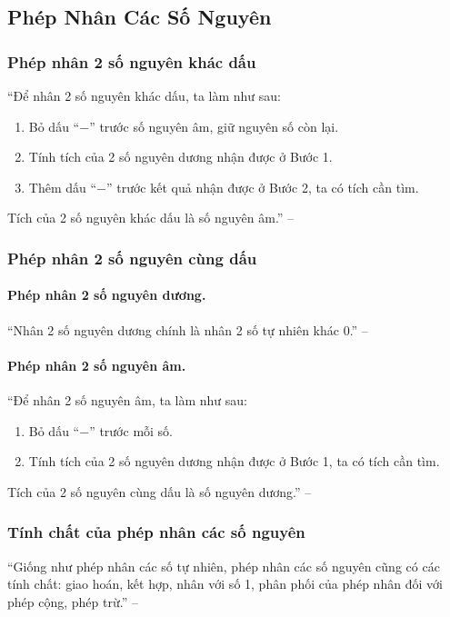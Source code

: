 \documentclass{article}
\numberwithin{equation}{section}
\begin{document}
\subsection{Phép Nhân Các Số Nguyên}

\subsubsection{Phép nhân 2 số nguyên khác dấu}
``Để nhân 2 số nguyên khác dấu, ta làm như sau:
\begin{enumerate}
	\item Bỏ dấu ``$-$'' trước số nguyên âm, giữ nguyên số còn lại.
	\item Tính tích của 2 số nguyên dương nhận được ở Bước 1.
	\item Thêm dấu ``$-$'' trước kết quả nhận được ở Bước 2, ta có tích cần tìm.
\end{enumerate}
Tích của 2 số nguyên khác dấu là số nguyên âm.'' -- \cite[p. 80]{Thai_Anh_Dat_Ha_Loan_Nam_Quang_Toan_6_tap_1}

\subsubsection{Phép nhân 2 số nguyên cùng dấu}

\paragraph{Phép nhân 2 số nguyên dương.} ``Nhân 2 số nguyên dương chính là nhân 2 số tự nhiên khác 0.'' -- \cite[p. 81]{Thai_Anh_Dat_Ha_Loan_Nam_Quang_Toan_6_tap_1}

\paragraph{Phép nhân 2 số nguyên âm.} ``Để nhân 2 số nguyên âm, ta làm như sau:
\begin{enumerate}
	\item Bỏ dấu ``$-$'' trước mỗi số.
	\item Tính tích của 2 số nguyên dương nhận được ở Bước 1, ta có tích cần tìm.
\end{enumerate}
Tích của 2 số nguyên cùng dấu là số nguyên dương.'' -- \cite[p. 81]{Thai_Anh_Dat_Ha_Loan_Nam_Quang_Toan_6_tap_1}

\subsubsection{Tính chất của phép nhân các số nguyên}
``Giống như phép nhân các số tự nhiên, phép nhân các số nguyên cũng có các tính chất: giao hoán, kết hợp, nhân với số 1, phân phối của phép nhân đối với phép cộng, phép trừ.'' -- \cite[p. 82]{Thai_Anh_Dat_Ha_Loan_Nam_Quang_Toan_6_tap_1}
\end{document}
